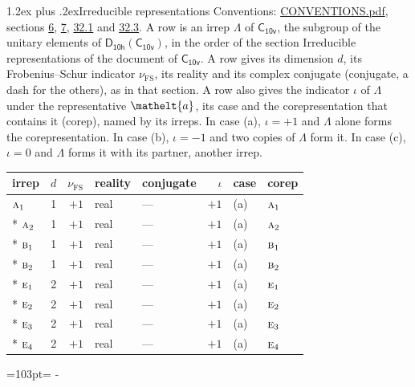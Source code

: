 \documentclass[10pt,a4paper]{article}
\makeatletter
\renewcommand\section{\@startsection{section}{1}{\z@}{-3ex plus -1ex minus -.2ex}%
  {1.2ex plus .2ex}{\normalfont\large\sffamily\bfseries\color{parttitle}}}
\newcommand{\needspace}[1]{\par\penalty-100\begingroup\dimen0=#1\relax\dimen2=\pagegoal
  \advance\dimen2-\pagetotal\ifdim\dimen0>\dimen2\relax\ifdim\dimen2>0pt\vfil\break\fi\fi
  \endgroup}
\numberwithin{equation}{section}
\newcommand{\eltfont}[1]{{\let\sigma\eltsigma\mathelt{#1}}}
\newcommand{\grp}[1]{\mathsf{#1}}
\newcommand{\irr}[1]{\text{\normalfont\scshape #1}}
\newcommand{\elt}[1]{\eltfont{#1}}
\newcommand{\fsind}{\nu_{\mathrm{FS}}}
\makeatother
\begin{document}
\section{Irreducible representations}\label{s:irreps}
Conventions: \href{../../CONVENTIONS.pdf}{CONVENTIONS.pdf}, sections \href{../../../rotation/CONVENTIONS.pdf\#conv.6}{6}, \href{../../../rotation/CONVENTIONS.pdf\#conv.7}{7}, \href{../../CONVENTIONS.pdf\#conv.32.1}{32.1} and \href{../../CONVENTIONS.pdf\#conv.32.3}{32.3}.
\leavevmode\label{n:irrep.Delta}A row is an irrep $\Lambda$ of $\grp{C_{10v}}$, the subgroup of the unitary elements of $\grp{D_{10h}}(\grp{C_{10v}})$, in the order of the section Irreducible representations of the document of \href{../../../rotation/data/pdf/C10v.pdf}{$\grp{C_{10v}}$}. \label{n:index.dimension}\label{n:index.frobenius}\label{n:head.irrep}\label{n:head.reality}\label{n:head.conjugate}A row gives its dimension $d$, its Frobenius--Schur indicator $\fsind$, its reality and its complex conjugate (conjugate, a dash for the others), as in that section. \label{n:head.case.corep}\label{n:head.corep}A row also gives the indicator $\iota$ of $\Lambda$ under the representative $\elt{a}$, its case and the corepresentation that contains it (corep), named by its irreps. In case (a), $\iota = +1$ and $\Lambda$ alone forms the corepresentation. In case (b), $\iota = -1$ and two copies of $\Lambda$ form it. In case (c), $\iota = 0$ and $\Lambda$ forms it with its partner, another irrep.
\setlength{\emergencystretch}{2em}\par\setlength{\emergencystretch}{0pt}
{\small\renewcommand{\arraystretch}{1.25}\setlength{\tabcolsep}{4pt}\begin{longtable}{@{}lrrllrll@{}}\toprule
irrep & $d$ & $\fsind$ & reality & conjugate & $\iota$ & case & corep\\\midrule\endhead
\bottomrule\endfoot\endlastfoot
$\irr{a}_{1}$ & 1 & $+1$ & real & --- & $+1$ & (a) & $\irr{a}_{1}$\\*
$\irr{a}_{2}$ & 1 & $+1$ & real & --- & $+1$ & (a) & $\irr{a}_{2}$\\*
$\irr{b}_{1}$ & 1 & $+1$ & real & --- & $+1$ & (a) & $\irr{b}_{1}$\\*
$\irr{b}_{2}$ & 1 & $+1$ & real & --- & $+1$ & (a) & $\irr{b}_{2}$\\*
$\irr{e}_{1}$ & 2 & $+1$ & real & --- & $+1$ & (a) & $\irr{e}_{1}$\\*
$\irr{e}_{2}$ & 2 & $+1$ & real & --- & $+1$ & (a) & $\irr{e}_{2}$\\*
$\irr{e}_{3}$ & 2 & $+1$ & real & --- & $+1$ & (a) & $\irr{e}_{3}$\\*
$\irr{e}_{4}$ & 2 & $+1$ & real & --- & $+1$ & (a) & $\irr{e}_{4}$\\
\bottomrule\end{longtable}}
\needspace{103pt}
\end{document}
